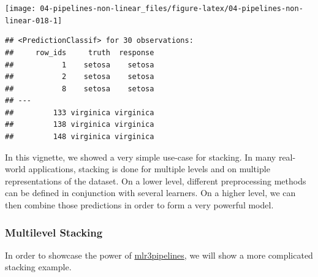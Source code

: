 \documentclass[
]{scrbook}
\newenvironment{Shaded}{\begin{snugshade}}{\end{snugshade}}
\newcommand{\AttributeTok}[1]{\textcolor[rgb]{0.77,0.63,0.00}{#1}}
\newcommand{\ConstantTok}[1]{\textcolor[rgb]{0.00,0.00,0.00}{#1}}
\newcommand{\FunctionTok}[1]{\textcolor[rgb]{0.00,0.00,0.00}{#1}}
\newcommand{\NormalTok}[1]{#1}
\newcommand{\OtherTok}[1]{\textcolor[rgb]{0.56,0.35,0.01}{#1}}
\newcommand{\SpecialCharTok}[1]{\textcolor[rgb]{0.00,0.00,0.00}{#1}}
\newcommand{\StringTok}[1]{\textcolor[rgb]{0.31,0.60,0.02}{#1}}
\renewenvironment{Shaded} {\begin{snugshade}\small} {\end{snugshade}}
\begin{document}
\begin{Shaded}
\end{Shaded}

\begin{center}\texttt{[image: 04-pipelines-non-linear\_files/figure-latex/04-pipelines-non-linear-018-1]} \end{center}

\begin{Shaded}
\end{Shaded}

\begin{verbatim}
## <PredictionClassif> for 30 observations:
##     row_ids     truth  response
##           1    setosa    setosa
##           2    setosa    setosa
##           8    setosa    setosa
## ---                            
##         133 virginica virginica
##         138 virginica virginica
##         148 virginica virginica
\end{verbatim}

In this vignette, we showed a very simple use-case for stacking.
In many real-world applications, stacking is done for multiple levels and on multiple representations of the dataset.
On a lower level, different preprocessing methods can be defined in conjunction with several learners.
On a higher level, we can then combine those predictions in order to form a very powerful model.

\hypertarget{multilevel-stacking}{%
\subsubsection{Multilevel Stacking}\label{multilevel-stacking}}

In order to showcase the power of \href{https://mlr3pipelines.mlr-org.com}{mlr3pipelines}, we will show a more complicated stacking example.
\end{document}
